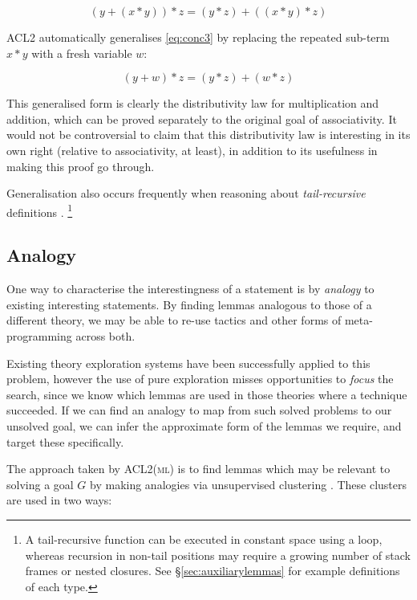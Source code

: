 \begin{equation}
  \tag{conc3}
  (y + (x * y)) * z = (y * z) + ((x * y) * z)
  \label{eq:conc3}
\end{equation}

ACL2 automatically generalises \eqref{eq:conc3} by replacing the repeated
sub-term $x * y$ with a fresh variable $w$:

\begin{equation}
  \tag{conc4}
  (y + w) * z = (y * z) + (w * z)
  \label{eq:conc4}
\end{equation}

This generalised form is clearly the distributivity law for multiplication and
addition, which can be proved separately to the original goal of
associativity. It would not be controversial to claim that this distributivity
law is interesting in its own right (relative to associativity, at least), in
addition to its usefulness in making this proof go through.


Generalisation also occurs frequently when reasoning about \emph{tail-recursive}
definitions \cite{kapur2003automatic}. \footnote{A tail-recursive function can
  be executed in constant space using a loop, whereas recursion in non-tail
  positions may require a growing number of stack frames or nested closures. See
  \S \ref{sec:auxiliarylemmas} for example definitions of each type.}

\subsection{Analogy}

One way to characterise the interestingness of a statement is by \emph{analogy}
to existing interesting statements. By finding lemmas analogous to those of a
different theory, we may be able to re-use tactics and other forms of
meta-programming across both.

Existing theory exploration systems have been successfully applied to this
problem, however the use of pure exploration misses opportunities to
\emph{focus} the search, since we know which lemmas are used in those theories
where a technique succeeded. If we can find an analogy to map from such solved
problems to our unsolved goal, we can infer the approximate form of the lemmas
we require, and target these specifically.

The approach taken by \textsc{ACL2(ml)} is to find lemmas which may be relevant
to solving a goal $G$ by making analogies via unsupervised clustering
\cite{Heras.Komendantskaya.Johansson.ea:2013}. These clusters are used in two
ways:

